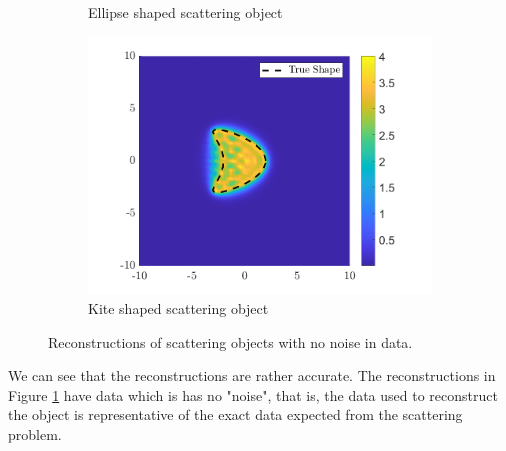 \documentclass[]{article}
\begin{document}
\begin{figure}[h]
\begin{subfigure}{.3\textwidth}
						\caption{Ellipse shaped scattering object}
					\end{subfigure}
					\begin{subfigure}{.3\textwidth}
						\centering
						\includegraphics[width = \textwidth]{Numeric Simulations/Images/kite-Reconstructed}
						\caption{Kite shaped scattering object}
					\end{subfigure}
					\caption{Reconstructions of scattering objects with no noise in data.}
					\label{fig:noiseless}
				\end{figure} 
				We can see that the reconstructions are rather accurate. The reconstructions in Figure \ref{fig:noiseless} have data which is has no "noise", that is, the data used to reconstruct the object is representative of the exact data expected from the scattering problem.
			
\end{document}
